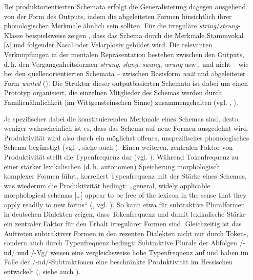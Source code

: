 \begin{sloppypar}
Bei produktorientierten Schemata erfolgt die Generalisierung dagegen ausgehend von der Form des Outputs, indem die abgeleiteten Formen hinsichtlich ihrer phonologischen Merkmale ähnlich sein sollten. Für die irreguläre \textit{string}/\textit{strung}{}-Klasse beispielsweise zeigen \citet[256]{BybeeModer1983}, dass das Schema durch die Merkmale Stammvokal [ʌ] und folgender Nasal oder Velarplosiv gebildet wird. Die relevanten Verknüpfungen in der mentalen Repräsentation bestehen zwischen den Outputs, d.\,h. den Vergangenheitsformen \textit{strung}, \textit{slung}, \textit{swung}, \textit{wrung} usw., und nicht -- wie bei den quellenorientierten Schemata -- zwischen Basisform \textit{wait} und abgeleiteter Form \textit{waited} (\citealt[255]{BybeeModer1983}). Die Struktur dieser outputbasierten Schemata ist dabei um einen Prototyp organisiert, die einzelnen Mitglieder des Schemas werden durch Familienähnlichkeit (im Wittgensteinschen Sinne) zusammengehalten (vgl. \citealt[430]{Bybee1995}, \citealt[256--257]{BybeeModer1983}).
\end{sloppypar}

Je spezifischer dabei die konstituierenden Merkmale eines Schemas sind, desto weniger wahrscheinlich ist es, dass das Schema auf neue Formen ausgedehnt wird. Produktivität wird also durch ein möglichst offenes, unspezifisches phonologisches Schema begünstigt (vgl. \cites[138]{Bybee1988}[452]{Bybee1995}, siehe auch \citealt{BittnerKöpcke2016}). Einen weiteren, zentralen Faktor von Produktivität stellt die Typenfrequenz dar (vgl. \citealt[232]{Bybee1995}). Während Tokenfrequenz zu einer stärker lexikalischen (d.\,h. autonomen) Speicherung morphologisch komplexer Formen führt, korreliert Typenfrequenz mit der Stärke eines Schemas, was wiederum die Produktivität bedingt: „general, widely applicable morphological schemas [\ldots] appear to be free of the lexicon in the sense that they apply readily to new forms“ (\citealt[135]{Bybee1988}, vgl. \citealt[452]{Bybee1995}). So kann \citet[191--195]{Birkenes2014} etwa für subtraktive Pluralformen in deutschen Dialekten zeigen, dass Tokenfrequenz und damit lexikalische Stärke ein zentraler Faktor für den Erhalt irregulärer Formen sind. Gleichzeitig ist das Auftreten subtraktiver Formen in den rezenten Dialekten nicht nur durch Token-, sondern auch durch Typenfrequenz bedingt: Subtraktive Plurale der Abfolgen /-nd/ und /-Vg/ weisen eine vergleichsweise hohe Typenfrequenz auf und haben im Falle der /-nd/-Subtraktionen eine beschränkte Produktivität im Hessischen entwickelt (\citealt[197--200]{Birkenes2014}, siehe auch \citealt{Birkenes2018}).

